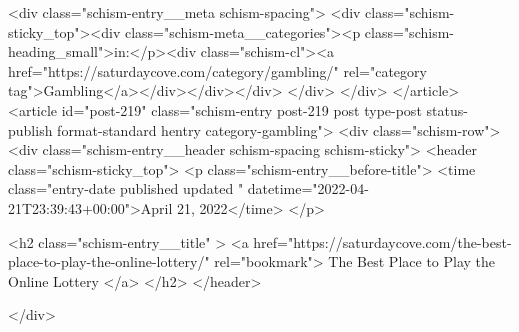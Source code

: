 {		<div class="schism-entry__meta schism-spacing">			<div class="schism-sticky_top"><div class="schism-meta__categories"><p class="schism-heading_small">in:</p><div class="schism-cl"><a href="https://saturdaycove.com/category/gambling/" rel="category tag">Gambling</a></div></div></div>		</div>
	</div>
</article>
<article id="post-219" class="schism-entry post-219 post type-post status-publish format-standard hentry category-gambling">
	<div class="schism-row">		<div class="schism-entry__header schism-spacing schism-sticky">			<header class="schism-sticky_top">				<p class="schism-entry__before-title">
					<time class="entry-date published updated " datetime="2022-04-21T23:39:43+00:00">April 21, 2022</time>				</p>

				<h2 class="schism-entry__title" >
					<a href="https://saturdaycove.com/the-best-place-to-play-the-online-lottery/" rel="bookmark">
						The Best Place to Play the Online Lottery					</a>
				</h2>
			</header>

					</div>

}
